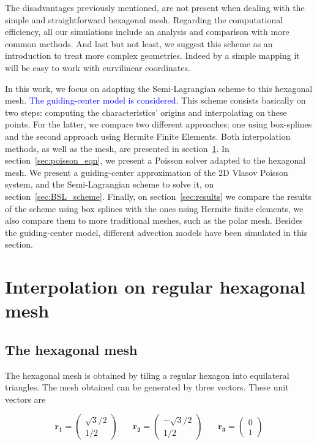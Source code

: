 \documentclass[proc]{edpsmath}
\begin{document}
The disadvantages previously mentioned, are not present when dealing with the simple and straightforward hexagonal mesh. Regarding the computational efficiency, all our simulations include an analysis and comparison with more common methods. And last but not least, we suggest this scheme as an introduction to treat more complex geometries. Indeed by a simple mapping it will be easy to work with curvilinear coordinates.

In this work, we focus on adapting the Semi-Lagrangian scheme to this hexagonal mesh. \textcolor{blue}{The guiding-center model is considered}. This scheme consists basically on two steps: computing the characteristics' origins and interpolating on these points. For the latter, we compare two different approaches: one using box-splines and the second approach using Hermite Finite Elements. Both interpolation methods, as well as the mesh, are presented in section~\ref{sec:interpolation}. In section~\ref{sec:poisson_eqn}, we present a Poisson solver adapted to the hexagonal mesh. We present a guiding-center approximation of the 2D Vlasov Poisson system\cite{Golse1998865}, and the Semi-Lagrangian scheme to solve it, on section~\ref{sec:BSL_scheme}. Finally, on section~\ref{sec:results} we compare the results of the scheme using box splines with the ones using Hermite finite elements, we also compare them to more traditional meshes, such as the polar mesh. Besides the guiding-center model, different advection models have been simulated in this section.


\section{Interpolation on regular hexagonal mesh}
\label{sec:interpolation}
\subsection{The hexagonal mesh}

The hexagonal mesh is obtained by tiling a regular hexagon into equilateral triangles. The mesh obtained can be generated by three vectors. These unit vectors are

\begin{equation}
	\mathbf{r_1} = \begin{pmatrix}\sqrt{3}/2 \\  1/2
		\end{pmatrix} ~~~~~~~~
	\mathbf{r_2} = \begin{pmatrix}-\sqrt{3}/2 \\ 1/2
		\end{pmatrix} ~~~~~~~~
	\mathbf{r_3} = \begin{pmatrix} 0 \\ 1
		\end{pmatrix}
\end{equation}
\end{document}
